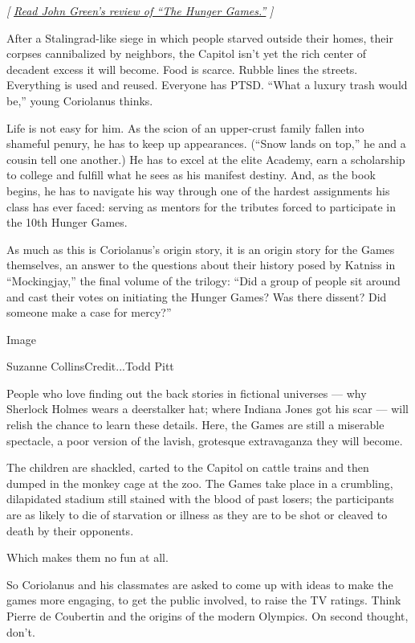 \emph{{[}}
\href{https://www.nytimes.com/2008/11/09/books/review/Green-t.html}{\emph{Read
John Green's review of ``The Hunger Games.''}} \emph{{]}}

After a Stalingrad-like siege in which people starved outside their
homes, their corpses cannibalized by neighbors, the Capitol isn't yet
the rich center of decadent excess it will become. Food is scarce.
Rubble lines the streets. Everything is used and reused. Everyone has
PTSD. ``What a luxury trash would be,'' young Coriolanus thinks.

Life is not easy for him. As the scion of an upper-crust family fallen
into shameful penury, he has to keep up appearances. (``Snow lands on
top,'' he and a cousin tell one another.) He has to excel at the elite
Academy, earn a scholarship to college and fulfill what he sees as his
manifest destiny. And, as the book begins, he has to navigate his way
through one of the hardest assignments his class has ever faced: serving
as mentors for the tributes forced to participate in the 10th Hunger
Games.

As much as this is Coriolanus's origin story, it is an origin story for
the Games themselves, an answer to the questions about their history
posed by Katniss in ``Mockingjay,'' the final volume of the trilogy:
``Did a group of people sit around and cast their votes on initiating
the Hunger Games? Was there dissent? Did someone make a case for
mercy?''

Image

Suzanne CollinsCredit...Todd Pitt

People who love finding out the back stories in fictional universes ---
why Sherlock Holmes wears a deerstalker hat; where Indiana Jones got his
scar --- will relish the chance to learn these details. Here, the Games
are still a miserable spectacle, a poor version of the lavish, grotesque
extravaganza they will become.

The children are shackled, carted to the Capitol on cattle trains and
then dumped in the monkey cage at the zoo. The Games take place in a
crumbling, dilapidated stadium still stained with the blood of past
losers; the participants are as likely to die of starvation or illness
as they are to be shot or cleaved to death by their opponents.

Which makes them no fun at all.

So Coriolanus and his classmates are asked to come up with ideas to make
the games more engaging, to get the public involved, to raise the TV
ratings. Think Pierre de Coubertin and the origins of the modern
Olympics. On second thought, don't.

